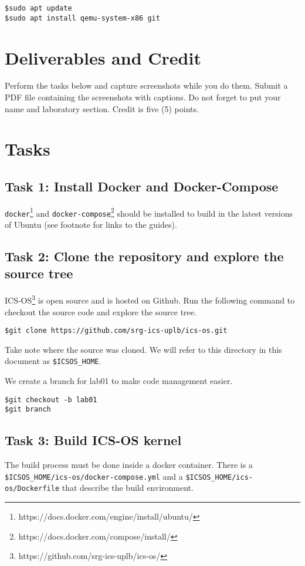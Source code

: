 \documentclass[a4paper, 11pt,oneside]{article}
\begin{document}
\begin{verbatim}
$sudo apt update
$sudo apt install qemu-system-x86 git
\end{verbatim}


\section{Deliverables and Credit}
Perform the tasks below and capture screenshots while you do them. Submit a PDF 
file containing the screenshots with captions. Do not forget to put your name 
and laboratory section. Credit is five (5) points.

\section{Tasks}

\subsection*{Task 1: Install Docker and Docker-Compose}
\texttt{docker}\footnote{https://docs.docker.com/engine/install/ubuntu/} and 
\texttt{docker-compose}\footnote{https://docs.docker.com/compose/install/} 
should be installed to build in the latest versions of Ubuntu (see footnote for 
links to the guides). 


\subsection*{Task 2: Clone the repository and explore the source tree}
ICS-OS\footnote{https://github.com/srg-ics-uplb/ics-os/} is open source and is 
hosted on Github. Run the following command to checkout the source code and 
explore the source tree.

\begin{verbatim}
$git clone https://github.com/srg-ics-uplb/ics-os.git
\end{verbatim}

Take note where the source was cloned. We will refer to this directory in 
this document as \texttt{\$ICSOS\_HOME}.

We create a branch for lab01 to make code management easier.
\begin{verbatim}
$git checkout -b lab01
$git branch
\end{verbatim}


\subsection*{Task 3: Build ICS-OS kernel}
The build process must be done inside a docker container. There is a 
\texttt{\$ICSOS\_HOME/ics-os/docker-compose.yml} and a 
\texttt{\$ICSOS\_HOME/ics-os/Dockerfile} that describe the build environment.
\end{document}
